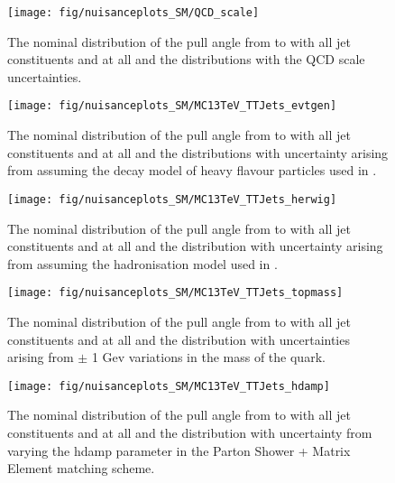 \begin{figure}[hbtp]
\centering
\def\twidth{0.45}
\texttt{[image: fig/nuisanceplots\_SM/QCD\_scale]}
\caption{The nominal distribution of the pull angle from \leadingjet to \scndleadingjet with all jet constituents and at all \DeltaR and the distributions with the QCD scale uncertainties.}
\label{fig:QCDscale}
\end{figure}

\begin{figure}[hbtp]
  \centering
  \def\twidth{0.45}
  \texttt{[image: fig/nuisanceplots\_SM/MC13TeV\_TTJets\_evtgen]}
  \caption{The nominal distribution of the pull angle from \leadingjet to \scndleadingjet with all jet constituents and at all \DeltaR and the distributions with uncertainty arising from assuming the decay model of heavy flavour particles used in \EVTGEN.}
  \label{fig:MC13TeV_TTJets_evtgen}
\end{figure}

\begin{figure}[hbtp]
  \centering
  \def\twidth{0.45}
  \texttt{[image: fig/nuisanceplots\_SM/MC13TeV\_TTJets\_herwig]}
  \caption{The nominal distribution of the pull angle from \leadingjet to \scndleadingjet with all jet constituents and at all \DeltaR and the distribution with uncertainty arising from assuming the hadronisation model used in \HERWIGpp.}
  \label{fig:MC13TeV_TTJets_herwig}
\end{figure}

\begin{figure}[hbtp]
  \centering
  \def\twidth{0.45}
  \texttt{[image: fig/nuisanceplots\_SM/MC13TeV\_TTJets\_topmass]}
  \caption{The nominal distribution of the pull angle from \leadingjet to \scndleadingjet with all jet constituents and at all \DeltaR and the distribution with uncertainties arising from $\pm$ 1 Gev variations in the mass of the \cPqt quark.}
  \label{fig:MC13TeV_TTJets_topmass}
\end{figure}

\begin{figure}[hbtp]
  \centering
  \def\twidth{0.45}
  \texttt{[image: fig/nuisanceplots\_SM/MC13TeV\_TTJets\_hdamp]}
  \caption{The nominal distribution of the pull angle from \leadingjet to \scndleadingjet with all jet constituents and at all \DeltaR and the distribution with uncertainty from varying the hdamp parameter in the Parton Shower + Matrix Element matching scheme.}
  \label{fig:MC13TeV_TTJets_hdamp}
\end{figure}

